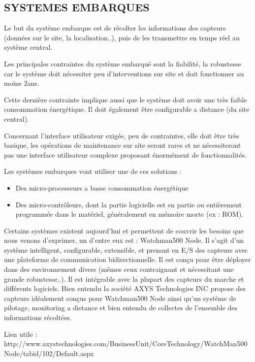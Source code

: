 \documentclass{article}
\begin{document}
\subsection{SYSTEMES EMBARQUES}

		Le but du système embarque est de récolter les informations des capteurs (données sur le site, la localisation..),
	puis de les transmettre en temps réel au système central.
		
		Les principales contraintes du système embarqué sont la fiabilité, la robustesse car le système doit nécessiter peu d'interventions sur site et doit fonctionner au moins 2ans. 
		
		Cette dernière contrainte implique aussi que le système doit avoir une très faible consommation énergétique. Il doit également être configurable a distance (du site central).
		
		Concernant l'interface utilisateur exigée, peu de contraintes, elle doit être très basique, les opérations de maintenance sur site seront rares et ne nécessiteront pas une interface utilisateur complexe proposant énormément de fonctionnalités.
		
		Les systèmes embarques vont utiliser une de ces solutions :
		\begin{itemize}
				\item Des micro-processeurs a basse consommation énergétique
				\item Des micro-contrôleurs, dont la partie logicielle est en partie ou entièrement programmée dans le matériel, généralement en mémoire morte (ex : ROM).
		\end{itemize}

		Certains systèmes existent aujourd'hui et permettent de couvrir les besoins que nous venons d'exprimer, un d'entre eux est : Watchman500 Node. Il s'agit d'un système intelligent, configurable, extensible, et prenant en E/S des capteurs avec une plateforme de communication bidirectionnelle. Il est conçu pour être déployer dans des environnement divers (mêmes ceux contraignant et nécessitant une grande robustesse..). Il est intégrable avec la plupart des capteurs du marche et différents logiciels. Bien entendu la société AXYS Technologies INC propose des capteurs idéalement conçus pour Watchman500 Node ainsi qu'un système de pilotage, monitoring a distance et bien entendu de collectes de l'ensemble des informations récoltées.
		
		Lien utile : http://www.axystechnologies.com/BusinessUnit/CoreTechnology/WatchMan500Node/tabid/102/Default.aspx
\end{document}
